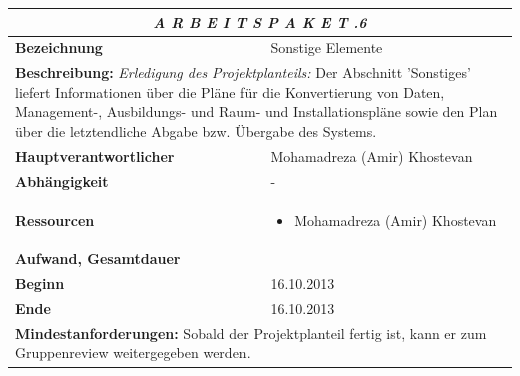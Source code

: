 \documentclass[fontsize=12pt,paper=a4,twoside]{scrartcl}
\begin{document}
\begin{tabular}{p{7.5cm}|p{7.5cm}}\toprule
\multicolumn{2}{c}{\textbf{\textit{A R B E I T S P A K E T \quad 1.1.6}}} \\ \toprule \hline
\textbf{Bezeichnung} & Sonstige Elemente\\\hline
\multicolumn{2}{p{15cm}}{\textbf{Beschreibung:} \newline 
\textit{Erledigung des Projektplanteils:} Der Abschnitt 'Sonstiges' liefert Informationen über die Pläne für die Konvertierung von Daten, Management-, Ausbildungs- und Raum- und Installationspläne sowie den Plan über die letztendliche Abgabe bzw. Übergabe des Systems. }  \\\hline
\textbf{Hauptverantwortlicher} & Mohamadreza (Amir) Khostevan \\\hline
\textbf{Abhängigkeit} & -\\\hline
\textbf{Ressourcen} & \begin{itemize} 
\itemsep0pt
\item Mohamadreza (Amir) Khostevan
\end{itemize} \\\hline
\textbf{Aufwand, Gesamtdauer} & \\\hline
\textbf{Beginn} & 16.10.2013 \\\hline
\textbf{Ende} & 16.10.2013\\\hline
\multicolumn{2}{p{15cm}}{\textbf{Mindestanforderungen: } \newline
Sobald der Projektplanteil fertig ist, kann er zum Gruppenreview weitergegeben werden. }  \\ \toprule
\end{tabular} \\\\
\end{document}
